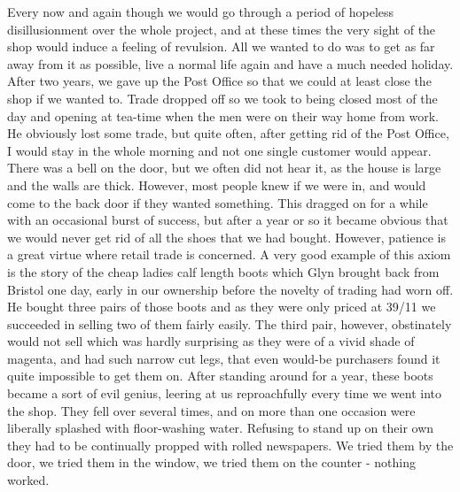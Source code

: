 Every now and again though we would go through a period of hopeless disillusionment over the whole project, and at these times the very sight of the shop would induce a feeling of revulsion. All we wanted to do was to get as far away from it as possible, live a normal life again and have a much needed holiday. After two years, we gave up the Post Office so that we could at least close the shop if we wanted to. Trade dropped off so we took to being closed most of the day and opening at tea-time when the men were on their way home from work. He obviously lost some trade, but quite often, after getting rid of the Post Office, I would stay in the whole morning and not one single customer would appear. There was a bell on the door, but we often did not hear it, as the house is large and the walls are thick. However, most people knew if we were in, and would come to the back door if they wanted something. This dragged on for a while with an occasional burst of success, but after a year or so it became obvious that we would never get rid of all the shoes that we had bought. However, patience is a great virtue where retail trade is concerned. A very good example of this axiom is the story of the cheap ladies calf length boots which Glyn brought back from Bristol one day, early in our ownership before the novelty of trading had worn off. He bought three pairs of those boots and as they were only priced at 39/11 we succeeded in selling two of them fairly easily. The third pair, however, obstinately would not sell which was hardly surprising as they were of a vivid shade of magenta, and had such narrow cut legs, that even would-be purchasers found it quite impossible to get them on. After standing around for a year, these boots became a sort of evil genius, leering at us reproachfully every time we went into the shop. They fell over several times, and on more than one occasion were liberally splashed with floor-washing water. Refusing to stand up on their own they had to be continually propped with rolled newspapers. We tried them by the door, we tried them in the window, we tried them on the counter - nothing worked.

